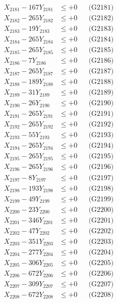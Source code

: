 \documentclass[a4paper,10pt]{article}
\begin{document}
{\begin{align}
\allowbreak
X_{2181} - 167Y_{2181} &\leq +0 && \text{(G2181)} \\
X_{2182} - 265Y_{2182} &\leq +0 && \text{(G2182)} \\
X_{2183} - 19Y_{2183} &\leq +0 && \text{(G2183)} \\
X_{2184} - 265Y_{2184} &\leq +0 && \text{(G2184)} \\
X_{2185} - 265Y_{2185} &\leq +0 && \text{(G2185)} \\
X_{2186} - 7Y_{2186} &\leq +0 && \text{(G2186)} \\
X_{2187} - 265Y_{2187} &\leq +0 && \text{(G2187)} \\
X_{2188} - 189Y_{2188} &\leq +0 && \text{(G2188)} \\
X_{2189} - 31Y_{2189} &\leq +0 && \text{(G2189)} \\
X_{2190} - 26Y_{2190} &\leq +0 && \text{(G2190)} \\
\allowbreak
X_{2191} - 265Y_{2191} &\leq +0 && \text{(G2191)} \\
X_{2192} - 265Y_{2192} &\leq +0 && \text{(G2192)} \\
X_{2193} - 55Y_{2193} &\leq +0 && \text{(G2193)} \\
X_{2194} - 265Y_{2194} &\leq +0 && \text{(G2194)} \\
X_{2195} - 265Y_{2195} &\leq +0 && \text{(G2195)} \\
X_{2196} - 265Y_{2196} &\leq +0 && \text{(G2196)} \\
X_{2197} - 8Y_{2197} &\leq +0 && \text{(G2197)} \\
X_{2198} - 193Y_{2198} &\leq +0 && \text{(G2198)} \\
X_{2199} - 49Y_{2199} &\leq +0 && \text{(G2199)} \\
X_{2200} - 23Y_{2200} &\leq +0 && \text{(G2200)} \\
\allowbreak
X_{2201} - 346Y_{2201} &\leq +0 && \text{(G2201)} \\
X_{2202} - 47Y_{2202} &\leq +0 && \text{(G2202)} \\
X_{2203} - 351Y_{2203} &\leq +0 && \text{(G2203)} \\
X_{2204} - 277Y_{2204} &\leq +0 && \text{(G2204)} \\
X_{2205} - 306Y_{2205} &\leq +0 && \text{(G2205)} \\
X_{2206} - 672Y_{2206} &\leq +0 && \text{(G2206)} \\
X_{2207} - 309Y_{2207} &\leq +0 && \text{(G2207)} \\
X_{2208} - 672Y_{2208} &\leq +0 && \text{(G2208)} \\

\end{align}}
\end{document}
